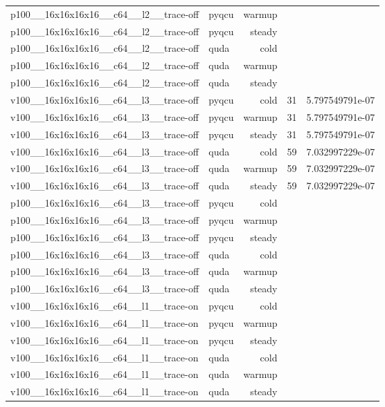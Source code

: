 \begin{table}[htbp]
\begin{tabular}{@{}llrrr@{}}
p100\_\_16x16x16x16\_\_c64\_\_l2\_\_trace-off & pyqcu & warmup &  &  \\
p100\_\_16x16x16x16\_\_c64\_\_l2\_\_trace-off & pyqcu & steady &  &  \\
p100\_\_16x16x16x16\_\_c64\_\_l2\_\_trace-off & quda & cold &  &  \\
p100\_\_16x16x16x16\_\_c64\_\_l2\_\_trace-off & quda & warmup &  &  \\
p100\_\_16x16x16x16\_\_c64\_\_l2\_\_trace-off & quda & steady &  &  \\
v100\_\_16x16x16x16\_\_c64\_\_l3\_\_trace-off & pyqcu & cold & 31 & 5.797549791e-07 \\
v100\_\_16x16x16x16\_\_c64\_\_l3\_\_trace-off & pyqcu & warmup & 31 & 5.797549791e-07 \\
v100\_\_16x16x16x16\_\_c64\_\_l3\_\_trace-off & pyqcu & steady & 31 & 5.797549791e-07 \\
v100\_\_16x16x16x16\_\_c64\_\_l3\_\_trace-off & quda & cold & 59 & 7.032997229e-07 \\
v100\_\_16x16x16x16\_\_c64\_\_l3\_\_trace-off & quda & warmup & 59 & 7.032997229e-07 \\
v100\_\_16x16x16x16\_\_c64\_\_l3\_\_trace-off & quda & steady & 59 & 7.032997229e-07 \\
p100\_\_16x16x16x16\_\_c64\_\_l3\_\_trace-off & pyqcu & cold &  &  \\
p100\_\_16x16x16x16\_\_c64\_\_l3\_\_trace-off & pyqcu & warmup &  &  \\
p100\_\_16x16x16x16\_\_c64\_\_l3\_\_trace-off & pyqcu & steady &  &  \\
p100\_\_16x16x16x16\_\_c64\_\_l3\_\_trace-off & quda & cold &  &  \\
p100\_\_16x16x16x16\_\_c64\_\_l3\_\_trace-off & quda & warmup &  &  \\
p100\_\_16x16x16x16\_\_c64\_\_l3\_\_trace-off & quda & steady &  &  \\
v100\_\_16x16x16x16\_\_c64\_\_l1\_\_trace-on & pyqcu & cold &  &  \\
v100\_\_16x16x16x16\_\_c64\_\_l1\_\_trace-on & pyqcu & warmup &  &  \\
v100\_\_16x16x16x16\_\_c64\_\_l1\_\_trace-on & pyqcu & steady &  &  \\
v100\_\_16x16x16x16\_\_c64\_\_l1\_\_trace-on & quda & cold &  &  \\
v100\_\_16x16x16x16\_\_c64\_\_l1\_\_trace-on & quda & warmup &  &  \\
v100\_\_16x16x16x16\_\_c64\_\_l1\_\_trace-on & quda & steady &  &  \\

\end{tabular}
\end{table}
